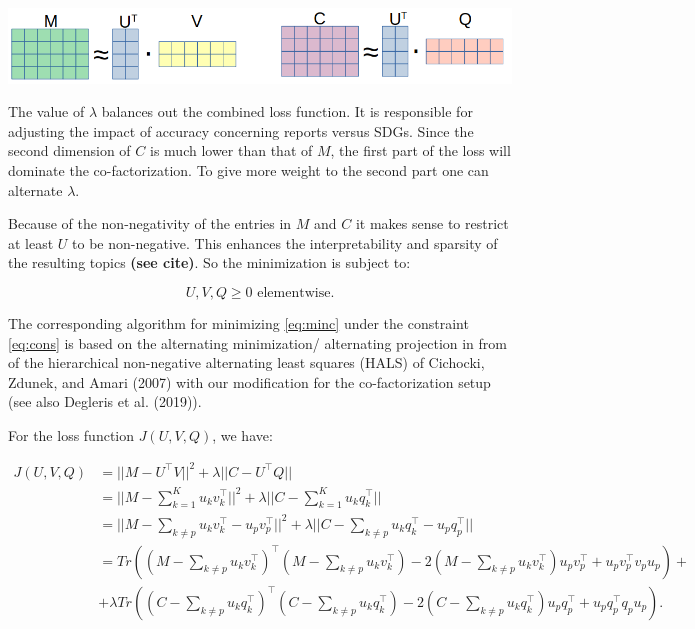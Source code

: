 \documentclass[
]{article}
\begin{document}
\hfil\includegraphics[width=1\textwidth,height=\textheight]{./images/mf2.png}\hfil

The value of \(\lambda\) balances out the combined loss function. It is responsible for adjusting the impact of accuracy concerning reports versus SDGs. Since the second dimension of \(C\) is much lower than that of \(M\), the first part of the loss will dominate the co-factorization. To give more weight to the second part one can alternate \(\lambda\).

Because of the non-negativity of the entries in \(M\) and \(C\) it makes sense to restrict at least \(U\) to be non-negative. This enhances the interpretability and sparsity of the resulting topics \textbf{(see cite)}. So the minimization is subject to:

\begin{equation}U, V,Q \geq 0 \text{ elementwise.}\label{eq:cons}
\end{equation}

The corresponding algorithm for minimizing \eqref{eq:minc} under the constraint \eqref{eq:cons} is based on the alternating minimization/ alternating projection in from of the hierarchical non-negative alternating least squares (HALS) of Cichocki, Zdunek, and Amari (2007) with our modification for the co-factorization setup (see also Degleris et al. (2019)).

For the loss function \(J(U,V,Q)\), we have:

\begin{align*}J(U,V,Q) &= ||M-U^\top V||^2 + \lambda ||C-U^\top Q|| \\
&= ||M-\sum_{k=1}^K u_kv_k^\top||^2 + \lambda ||C-\sum_{k=1}^K u_kq_k^\top||\\
&=||M-\sum_{k\not=p} u_kv_k^\top - u_pv_p^\top||^2 + \lambda ||C-\sum_{k\not=p} u_kq_k^\top - u_pq_p^\top||\\
&= Tr((M-\sum_{k\not=p} u_kv_k^\top)^\top (M-\sum_{k\not=p} u_kv_k^\top) - 2(M-\sum_{k\not=p} u_kv_k^\top)u_pv_p^\top + u_pv_p^\top v_p u_p) + \\
&+\lambda Tr((C-\sum_{k\not=p} u_kq_k^\top)^\top (C-\sum_{k\not=p} u_kq_k^\top) - 2(C-\sum_{k\not=p} u_kq_k^\top)u_pq_p^\top + u_pq_p^\top q_p u_p).
\end{align*}
\end{document}
